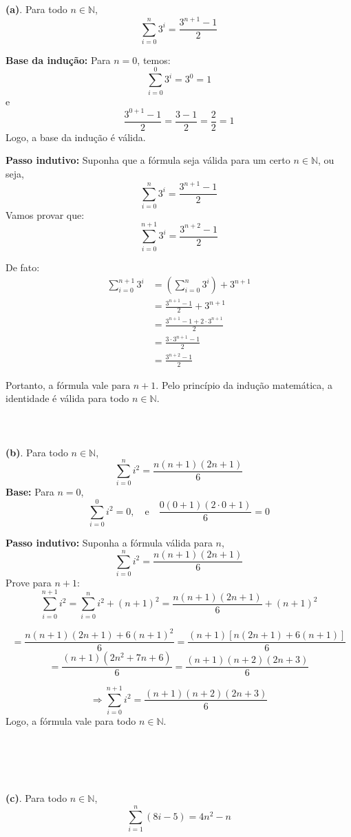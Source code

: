 \documentclass{article}
\begin{document}
\textbf{(a)}. 
Para todo \( n \in \mathbb{N} \),\[\sum_{i=0}^{n} 3^i=\frac{3^{n+1} - 1}{2}\]

\textbf{Base da indução:} Para \( n = 0 \), temos:
\[
\sum_{i=0}^{0} 3^i = 3^0 = 1
\]
e
\[
\frac{3^{0+1} - 1}{2} = \frac{3 - 1}{2} = \frac{2}{2} = 1
\]
Logo, a base da indução é válida.

\textbf{Passo indutivo:} Suponha que a fórmula seja válida para um certo \( n \in \mathbb{N} \), ou seja,
\[
\sum_{i=0}^{n} 3^i = \frac{3^{n+1} - 1}{2}
\]
Vamos provar que:
\[
\sum_{i=0}^{n+1} 3^i = \frac{3^{n+2} - 1}{2}
\]

De fato:
\begin{align*}
\sum_{i=0}^{n+1} 3^i &= \left( \sum_{i=0}^{n} 3^i \right) + 3^{n+1} \\
&= \frac{3^{n+1} - 1}{2} + 3^{n+1} \\
&= \frac{3^{n+1} - 1 + 2 \cdot 3^{n+1}}{2} \\
&= \frac{3 \cdot 3^{n+1} - 1}{2} \\
&= \frac{3^{n+2} - 1}{2}
\end{align*}

Portanto, a fórmula vale para \( n+1 \). Pelo princípio da indução matemática, a identidade é válida para todo \( n \in \mathbb{N} \).
\\\\
\\\\
\textbf{(b)}. Para todo \( n \in \mathbb{N} \),
\[
\sum_{i=0}^{n} i^2 = \frac{n(n+1)(2n+1)}{6}
\]
\textbf{Base:} Para \( n = 0 \),
\[
\sum_{i=0}^0 i^2 = 0, \quad \text{e} \quad \frac{0(0+1)(2 \cdot 0 + 1)}{6} = 0
\]

\textbf{Passo indutivo:} Suponha a fórmula válida para \( n \),
\[
\sum_{i=0}^n i^2 = \frac{n(n+1)(2n+1)}{6}
\]
Prove para \( n+1 \):
\[
\sum_{i=0}^{n+1} i^2 = \sum_{i=0}^n i^2 + (n+1)^2 = \frac{n(n+1)(2n+1)}{6} + (n+1)^2
\]

\[
= \frac{n(n+1)(2n+1) + 6(n+1)^2}{6} = \frac{(n+1)\left[n(2n+1)+6(n+1)\right]}{6}
\]
\[
= \frac{(n+1)(2n^2 + 7n + 6)}{6} = \frac{(n+1)(n+2)(2n+3)}{6}
\]

\[
\Rightarrow \sum_{i=0}^{n+1} i^2 = \frac{(n+1)(n+2)(2n+3)}{6}
\]
Logo, a fórmula vale para todo \( n \in \mathbb{N} \).




\\\\
\\\\
\textbf{(c)}. Para todo \( n \in \mathbb{N} \),
\[
\sum_{i=1}^{n} (8i - 5) = 4n^2 - n
\]
\end{document}
